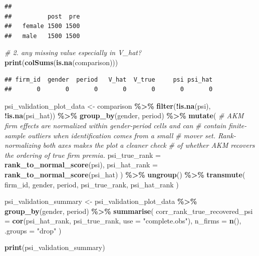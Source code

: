 \documentclass[
]{article}
\newenvironment{Shaded}{\begin{snugshade}}{\end{snugshade}}
\newcommand{\AttributeTok}[1]{\textcolor[rgb]{0.13,0.29,0.53}{#1}}
\newcommand{\CommentTok}[1]{\textcolor[rgb]{0.56,0.35,0.01}{\textit{#1}}}
\newcommand{\FunctionTok}[1]{\textcolor[rgb]{0.13,0.29,0.53}{\textbf{#1}}}
\newcommand{\NormalTok}[1]{#1}
\newcommand{\OtherTok}[1]{\textcolor[rgb]{0.56,0.35,0.01}{#1}}
\newcommand{\SpecialCharTok}[1]{\textcolor[rgb]{0.81,0.36,0.00}{\textbf{#1}}}
\newcommand{\StringTok}[1]{\textcolor[rgb]{0.31,0.60,0.02}{#1}}
\begin{document}
\begin{verbatim}
##         
##          post  pre
##   female 1500 1500
##   male   1500 1500
\end{verbatim}

\begin{Shaded}
\begin{Highlighting}[]
\CommentTok{\# 2. any missing value especially in V\_hat?}
\FunctionTok{print}\NormalTok{(}\FunctionTok{colSums}\NormalTok{(}\FunctionTok{is.na}\NormalTok{(comparison)))}
\end{Highlighting}
\end{Shaded}

\begin{verbatim}
## firm_id  gender  period   V_hat  V_true     psi psi_hat 
##       0       0       0       0       0       0       0
\end{verbatim}

\begin{Shaded}
\begin{Highlighting}[]
\NormalTok{psi\_validation\_plot\_data }\OtherTok{\textless{}{-}}\NormalTok{ comparison }\SpecialCharTok{\%\textgreater{}\%}
    \FunctionTok{filter}\NormalTok{(}\SpecialCharTok{!}\FunctionTok{is.na}\NormalTok{(psi), }\SpecialCharTok{!}\FunctionTok{is.na}\NormalTok{(psi\_hat)) }\SpecialCharTok{\%\textgreater{}\%}
    \FunctionTok{group\_by}\NormalTok{(gender, period) }\SpecialCharTok{\%\textgreater{}\%}
    \FunctionTok{mutate}\NormalTok{(}
        \CommentTok{\# AKM firm effects are normalized within gender{-}period cells and can}
        \CommentTok{\# contain finite{-}sample outliers when identification comes from a small}
        \CommentTok{\# mover set. Rank{-}normalizing both axes makes the plot a cleaner check}
        \CommentTok{\# of whether AKM recovers the ordering of true firm premia.}
        \AttributeTok{psi\_true\_rank =} \FunctionTok{rank\_to\_normal\_score}\NormalTok{(psi),}
        \AttributeTok{psi\_hat\_rank =} \FunctionTok{rank\_to\_normal\_score}\NormalTok{(psi\_hat)}
\NormalTok{    ) }\SpecialCharTok{\%\textgreater{}\%}
    \FunctionTok{ungroup}\NormalTok{() }\SpecialCharTok{\%\textgreater{}\%}
    \FunctionTok{transmute}\NormalTok{(}
\NormalTok{        firm\_id,}
\NormalTok{        gender,}
\NormalTok{        period,}
\NormalTok{        psi\_true\_rank,}
\NormalTok{        psi\_hat\_rank}
\NormalTok{    )}

\NormalTok{psi\_validation\_summary }\OtherTok{\textless{}{-}}\NormalTok{ psi\_validation\_plot\_data }\SpecialCharTok{\%\textgreater{}\%}
    \FunctionTok{group\_by}\NormalTok{(gender, period) }\SpecialCharTok{\%\textgreater{}\%}
    \FunctionTok{summarise}\NormalTok{(}
        \AttributeTok{corr\_rank\_true\_recovered\_psi =} \FunctionTok{cor}\NormalTok{(psi\_hat\_rank, psi\_true\_rank, }\AttributeTok{use =} \StringTok{"complete.obs"}\NormalTok{),}
        \AttributeTok{n\_firms =} \FunctionTok{n}\NormalTok{(),}
        \AttributeTok{.groups =} \StringTok{"drop"}
\NormalTok{    )}

\FunctionTok{print}\NormalTok{(psi\_validation\_summary)}
\end{Highlighting}
\end{Shaded}
\end{document}
